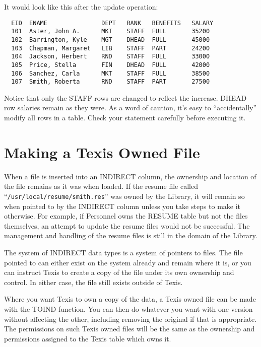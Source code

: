 It would look like this after the update operation:

\begin{screen}
\begin{verbatim}
  EID  ENAME               DEPT   RANK   BENEFITS   SALARY
  101  Aster, John A.      MKT    STAFF  FULL       35200
  102  Barrington, Kyle    MGT    DHEAD  FULL       45000
  103  Chapman, Margaret   LIB    STAFF  PART       24200
  104  Jackson, Herbert    RND    STAFF  FULL       33000
  105  Price, Stella       FIN    DHEAD  FULL       42000
  106  Sanchez, Carla      MKT    STAFF  FULL       38500
  107  Smith, Roberta      RND    STAFF  PART       27500
\end{verbatim}
\end{screen}

Notice that only the STAFF rows are changed to reflect the increase.
DHEAD row salaries remain as they were.  As a word of caution, it's
easy to ``accidentally'' modify all rows in a table.  Check your
statement carefully before executing it.

\section{Making a Texis Owned File}

When a file is inserted into an INDIRECT column, the ownership and
location of the file remains as it was when loaded.  If the resume
file called ``\verb`/usr/local/resume/smith.res`'' was owned by the
Library, it will remain so when pointed to by the INDIRECT column
unless you take steps to make it otherwise.  For example, if Personnel
owns the RESUME table but not the files themselves, an attempt to
update the resume files would not be successful.  The management and
handling of the resume files is still in the domain of the Library.

The system of INDIRECT data types is a system of pointers to files.
The file pointed to can either exist on the system already and remain
where it is, or you can instruct Texis to create a copy of the file
under its own ownership and control.  In either case, the file still
exists outside of Texis.

Where you want Texis to own a copy of the data, a Texis owned file can
be made with the TOIND function.  You can then do whatever you want
with one version without affecting the other, including removing the
original if that is appropriate.  The permissions on such Texis owned
files will be the same as the ownership and permissions assigned to
the Texis table which owns it.

